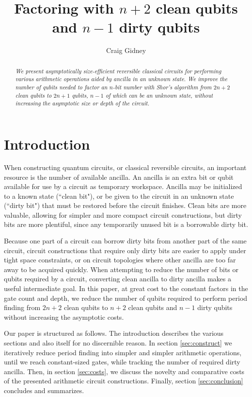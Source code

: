 \documentclass[twocolumn]{article}
\title{Factoring with $n+2$ clean qubits and $n-1$ dirty qubits}
\author{Craig Gidney}
\begin{document}
\maketitle

\begin{abstract}
\em
We present asymptotically size-efficient reversible classical circuits for performing various arithmetic operations aided by ancilla in an unknown state.
We improve the number of qubits needed to factor an $n$-bit number with Shor's algorithm \cite{Shor1999} from $2n+2$ clean qubits \cite{takahashi2006, haner2016} to $2n+1$ qubits, $n-1$ of which can be an unknown state, without increasing the asymptotic size or depth of the circuit.
\end{abstract}

\section{Introduction}

When constructing quantum circuits, or classical reversible circuits, an important resource is the number of available ancilla.
An ancilla is an extra bit or qubit available for use by a circuit as temporary workspace.
Ancilla may be initialized to a known state (``clean bit"), or be given to the circuit in an unknown state (``dirty bit") that must be restored before the circuit finishes.
Clean bits are more valuable, allowing for simpler and more compact circuit constructions, but dirty bits are more plentiful, since any temporarily unused bit is a borrowable dirty bit.

Because one part of a circuit can borrow dirty bits from another part of the same circuit, circuit constructions that require only dirty bits are easier to apply under tight space constraints, or on circuit topologies where other ancilla are too far away to be acquired quickly.
When attempting to reduce the number of bits or qubits required by a circuit, converting clean ancilla to dirty ancilla makes a useful intermediate goal.
In this paper, at great cost to the constant factors in the gate count and depth, we reduce the number of qubits required to perform period finding from $2n+2$ clean qubits \cite{takahashi2006, haner2016} to $n+2$ clean qubits and $n-1$ dirty qubits without increasing the asymptotic costs.

Our paper is structured as follows.
The introduction describes the various sections and also itself for no discernible reason.
In section \ref{sec:construct} we iteratively reduce period finding into simpler and simpler arithmetic operations, until we reach constant-sized gates, while tracking the number of required dirty ancilla.
Then, in section \ref{sec:costs}, we discuss the novelty and comparative costs of the presented arithmetic circuit constructions.
Finally, section \ref{sec:conclusion} concludes and summarizes.
\end{document}
